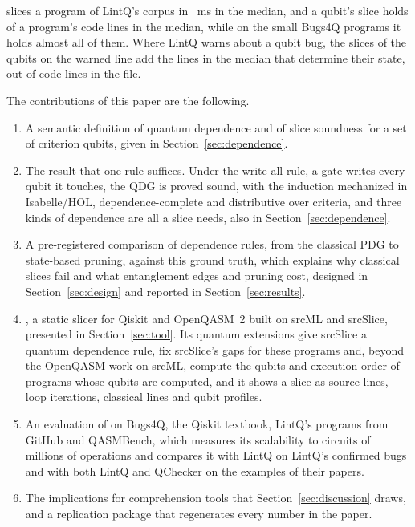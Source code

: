 \tool{} slices a program of LintQ's corpus in \numScaleSOneMedianMs{}~ms in the median, and a qubit's
slice holds \numScaleReadMedianPct{} of a program's code lines in the median, while on the small Bugs4Q
programs it holds almost all of them. Where LintQ warns about a qubit bug, the slices of the qubits on the
warned line add the \numLqReadMedian{} lines in the median that determine their state, out of \numLqCodeMedian{}
code lines in the file.

The contributions of this paper are the following.
\begin{enumerate}
\item A semantic definition of quantum dependence and of slice soundness for a set of criterion qubits,
given in Section~\ref{sec:dependence}.
\item The result that one rule suffices. Under the write-all rule, a gate writes every qubit it touches, the
QDG is proved sound, with the induction mechanized in Isabelle/HOL, dependence-complete and distributive
over criteria, and three kinds of dependence are all a slice needs, also in Section~\ref{sec:dependence}.
\item A pre-registered comparison of dependence rules, from the classical PDG to state-based pruning,
against this ground truth, which explains why classical slices fail and what entanglement edges and
pruning cost, designed in Section~\ref{sec:design} and reported in Section~\ref{sec:results}.
\item \tool{}, a static slicer for Qiskit and OpenQASM~2 built on srcML and srcSlice, presented in
Section~\ref{sec:tool}. Its quantum extensions give srcSlice a quantum dependence rule, fix srcSlice's gaps for
these programs and, beyond the OpenQASM work on srcML, compute the qubits and execution order of programs whose
qubits are computed, and it shows a slice as source lines, loop iterations,
classical lines and qubit profiles.
\item An evaluation of \tool{} on Bugs4Q, the Qiskit textbook, LintQ's \numScaleSOneFiles{} programs from
GitHub and QASMBench, which measures its scalability to circuits of millions of operations and compares it with
LintQ on LintQ's confirmed bugs and with both LintQ and QChecker on the examples of their papers.
\item The implications for comprehension tools that Section~\ref{sec:discussion} draws, and a replication
package that regenerates every number in the paper.
\end{enumerate}
